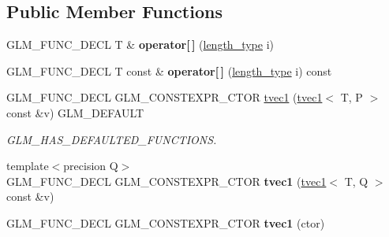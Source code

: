 \subsection*{Public Member Functions}
\begin{DoxyCompactItemize}
\item 
\mbox{\label{structglm_1_1tvec1_a51ab9cbe89195b12a6f12e5f7fb11636}} 
G\+L\+M\+\_\+\+F\+U\+N\+C\+\_\+\+D\+E\+CL T \& {\bfseries operator\mbox{[}$\,$\mbox{]}} (\hyperlink{structglm_1_1tvec1_ae6254cf662020a8328b744b40f419527}{length\+\_\+type} i)
\item 
\mbox{\label{structglm_1_1tvec1_a0c05545b98b1e81e1cfb1400f7c4cf5f}} 
G\+L\+M\+\_\+\+F\+U\+N\+C\+\_\+\+D\+E\+CL T const  \& {\bfseries operator\mbox{[}$\,$\mbox{]}} (\hyperlink{structglm_1_1tvec1_ae6254cf662020a8328b744b40f419527}{length\+\_\+type} i) const
\item 
\mbox{\label{structglm_1_1tvec1_a9a88135965c637f0926c293a039aedaa}} 
G\+L\+M\+\_\+\+F\+U\+N\+C\+\_\+\+D\+E\+CL G\+L\+M\+\_\+\+C\+O\+N\+S\+T\+E\+X\+P\+R\+\_\+\+C\+T\+OR \hyperlink{structglm_1_1tvec1_a9a88135965c637f0926c293a039aedaa}{tvec1} (\hyperlink{structglm_1_1tvec1}{tvec1}$<$ T, P $>$ const \&v) G\+L\+M\+\_\+\+D\+E\+F\+A\+U\+LT
\begin{DoxyCompactList}\small\item\em G\+L\+M\+\_\+\+H\+A\+S\+\_\+\+D\+E\+F\+A\+U\+L\+T\+E\+D\+\_\+\+F\+U\+N\+C\+T\+I\+O\+NS. \end{DoxyCompactList}\item 
\mbox{\label{structglm_1_1tvec1_a1b75698ea6119a8360b81348a9fc4c17}} 
{\footnotesize template$<$precision Q$>$ }\\G\+L\+M\+\_\+\+F\+U\+N\+C\+\_\+\+D\+E\+CL G\+L\+M\+\_\+\+C\+O\+N\+S\+T\+E\+X\+P\+R\+\_\+\+C\+T\+OR {\bfseries tvec1} (\hyperlink{structglm_1_1tvec1}{tvec1}$<$ T, Q $>$ const \&v)
\item 
\mbox{\label{structglm_1_1tvec1_a220aa05a31e5cb40d735ae61cf7aad40}} 
G\+L\+M\+\_\+\+F\+U\+N\+C\+\_\+\+D\+E\+CL G\+L\+M\+\_\+\+C\+O\+N\+S\+T\+E\+X\+P\+R\+\_\+\+C\+T\+OR {\bfseries tvec1} (ctor)
\item 
\mbox{\label{structglm_1_1tvec1_ae08ccaa2bb2b7495ca48a59bcc54afcd}} 

\end{DoxyCompactItemize}
